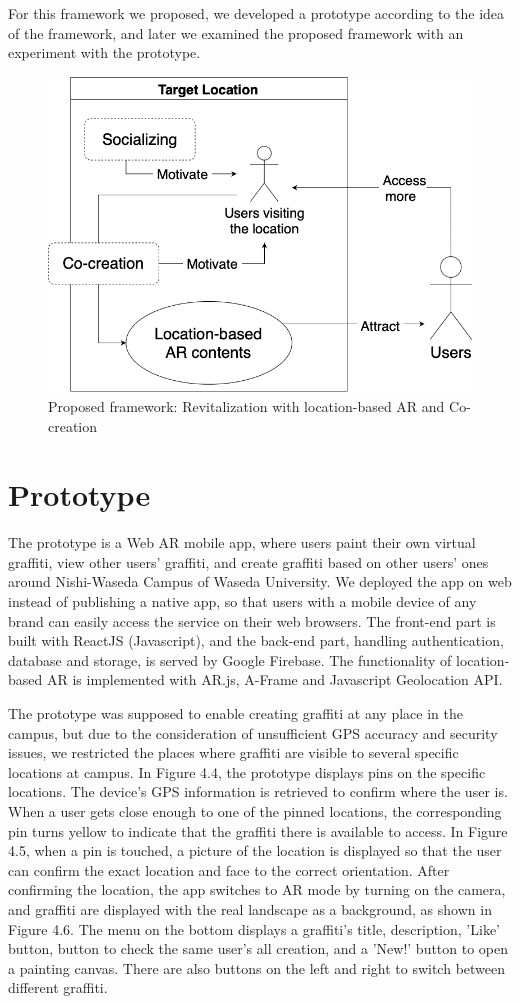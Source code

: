 For this framework we proposed, we developed a prototype according to the idea of the framework, and later we examined the proposed framework with an experiment with the prototype.

\begin{figure}
  \centering
  \includegraphics[width=0.8\columnwidth]{resources/4_methodology/revitalization_with_AR_and_cocreation.png}
    \caption{Proposed framework: Revitalization with location-based AR and Co-creation}
\end{figure}

\section{Prototype}
The prototype is a Web AR mobile app, where users paint their own virtual graffiti, view other users' graffiti, and create graffiti based on other users' ones around Nishi-Waseda Campus of Waseda University.
We deployed the app on web instead of publishing a native app, so that users with a mobile device of any brand can easily access the service on their web browsers.
The front-end part is built with ReactJS (Javascript), and the back-end part, handling authentication, database and storage, is served by Google Firebase.
The functionality of location-based AR is implemented with AR.js, A-Frame and Javascript Geolocation API.

The prototype was supposed to enable creating graffiti at any place in the campus, but due to the consideration of unsufficient GPS accuracy and security issues,
we restricted the places where graffiti are visible to several specific locations at campus.
In Figure 4.4, the prototype displays pins on the specific locations. The device's GPS information is retrieved to confirm where the user is.
When a user gets close enough to one of the pinned locations, the corresponding pin turns yellow to indicate that the graffiti there is available to access.
In Figure 4.5, when a pin is touched, a picture of the location is displayed so that the user can confirm the exact location and face to the correct orientation.
After confirming the location, the app switches to AR mode by turning on the camera, and graffiti are displayed with the real landscape as a background, as shown in Figure 4.6.
The menu on the bottom displays a graffiti's title, description, 'Like' button, button to check the same user's all creation, and a 'New!' button to open a painting canvas.
There are also buttons on the left and right to switch between different graffiti.

